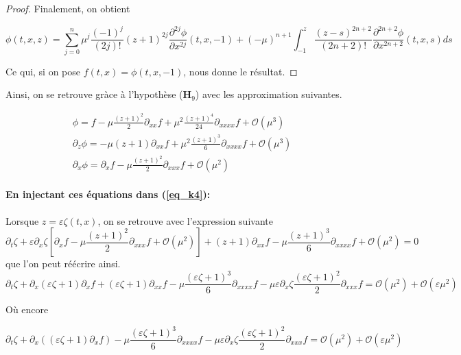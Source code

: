 \documentclass[12pt,a4paper]{article}
\numberwithin{equation}{section}
\begin{document}
\begin{proof}
Finalement, on obtient

    \begin{equation*}
        \phi (t,x,z) = \sum_{j = 0}^{n} \mu^j\frac{(-1)^j}{(2j)!} (z+1)^{2j}\frac{\partial^{2j}\phi}{\partial x^{2j}}(t,x,-1)
        + (-\mu)^{n+1}\int_{-1}^z\frac{(z-s)^{2n+2}}{(2n+2)!}\frac{\partial^{2n+2} \phi}{\partial x^{2n+2}}(t,x,s)ds
    \end{equation*}


Ce qui, si on pose $f(t,x) = \phi(t,x,-1)$, nous donne le résultat.
\end{proof}

Ainsi, on se retrouve gràce à l'hypothèse ($\textbf{H}_9$) avec les approximation suivantes.

\begin{equation}
    \begin{split}
            &\phi = f - \mu\frac{(z+1)^2}{2}\partial_{xx}f + \mu^2\frac{(z+1)^4}{24}\partial_{xxxx}f + \mathcal{O}(\mu^3)\\
            &\partial_z\phi = -\mu(z+1)\partial_{xx}f + \mu^2\frac{(z+1)^3}{6}\partial_{xxxx}f + \mathcal{O}(\mu^3)\\
            &\partial_x\phi = \partial_xf - \mu\frac{(z+1)^2}{2}\partial_{xxx}f + \mathcal{O}(\mu^2)
    \end{split}
\end{equation}
\paragraph{En injectant ces équations dans (\ref{eq_k4}):}
Lorsque $z = \varepsilon \zeta(t,x)$, on se retrouve avec l'expression suivante
\begin{equation*}
    \partial_{t}\zeta +  \varepsilon \partial_{x} \zeta  \left[\partial_xf - \mu\frac{(z+1)^2}{2}\partial_{xxx}f + \mathcal{O}(\mu^2) \right]  +  (z+1) \partial_{xx}f - \mu\frac{(z+1)^3}{6}\partial_{xxxx}f + \mathcal{O}(\mu^2) = 0
\end{equation*}
que l'on peut réécrire ainsi.
\begin{equation*}
    \partial_{t}\zeta +  \partial_{x}(\varepsilon \zeta+1) \partial_xf+  (\varepsilon\zeta+1) \partial_{xx}f    - \mu\frac{(\varepsilon\zeta+1)^3}{6}\partial_{xxxx}f - \mu \varepsilon\partial_{x}\zeta\frac{(\varepsilon\zeta+1)^2}{2}\partial_{xxx}f= \mathcal{O}(\mu^2) + \mathcal{O}(\varepsilon\mu^2) 
\end{equation*}

Où encore

\begin{equation}
    \partial_{t}\zeta +  \partial_{x}((\varepsilon \zeta+1) \partial_xf)    - \mu\frac{(\varepsilon\zeta+1)^3}{6}\partial_{xxxx}f - \mu \varepsilon\partial_{x}\zeta\frac{(\varepsilon\zeta+1)^2}{2}\partial_{xxx}f= \mathcal{O}(\mu^2) + \mathcal{O}(\varepsilon\mu^2) \label{eq_approx1} 
\end{equation}
\end{document}
